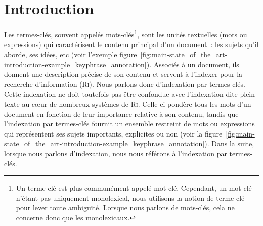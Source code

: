   \section{Introduction}
  \label{sec:main-state_of_the_art-introduction}
    Les termes-clés,
    souvent appelés mots-clés\footnote{Un terme-clé est plus communément appelé
    mot-clé. Cependant, un mot-clé n'étant pas uniquement monolexical, nous
    utilisons la notion de terme-clé pour lever toute ambiguïté. Lorsque nous parlons de mots-clés, cela ne concerne donc que les
    monolexicaux.}, sont les unités textuelles (mots ou expressions) qui
    caractérisent le contenu principal d'un document~: les sujets qu'il aborde,
    ses idées, etc (voir l'exemple
    figure~\ref{fig:main-state_of_the_art-introduction-example_keyphrase_annotation}).
    Associés à un document, ils donnent une description précise de son contenu
    et servent à l'indexer pour la recherche d'information (\textsc{Ri}). Nous
    parlons donc d'indexation par termes-clés. Cette indexation ne doit toutefois pas être confondue
    avec l'indexation dite \og{}plein texte\fg{} au c\oe{}ur de nombreux
    systèmes de \textsc{Ri}. Celle-ci pondère tous les mots d'un document en
    fonction de leur importance relative à son contenu, tandis que l'indexation
    par termes-clés fournit un ensemble restreint de mots ou expressions qui
    représentent ses sujets importants, explicites ou non (voir la figure~\ref{fig:main-state_of_the_art-introduction-example_keyphrase_annotation}). Dans la suite, lorsque nous parlons d'indexation, nous
    nous référons à l'indexation par termes-clés.
